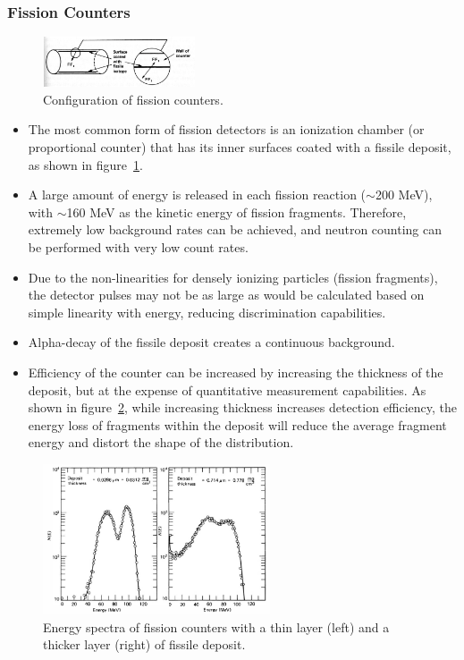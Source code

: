 \subsubsection{Fission Counters}
\begin{figure}[ht]
    \centering
    \includegraphics[width=0.4\textwidth]{images/fission_counter_config.png}
    \caption{Configuration of fission counters.}
    \label{fig:fission_counter_config}
\end{figure}
\begin{itemize}
    \item The most common form of fission detectors is an ionization chamber (or proportional counter) that has its inner surfaces coated with a fissile deposit, as shown in figure~\ref{fig:fission_counter_config}.
    \item A large amount of energy is released in each fission reaction ($\sim$200 MeV), with $\sim$160 MeV as the kinetic energy of fission fragments. Therefore, extremely low background rates can be achieved, and neutron counting can be performed with very low count rates. 
    \item Due to the non-linearities for densely ionizing particles (fission fragments), the detector pulses may not be as large as would be calculated based on simple linearity with energy, reducing discrimination capabilities.
    \item Alpha-decay of the fissile deposit creates a continuous background. 
    \item Efficiency of the counter can be increased by increasing the thickness of the deposit, but at the expense of quantitative measurement capabilities. As shown in figure~\ref{fig:fission_counter_efficiency}, while increasing thickness increases detection efficiency, the energy loss of fragments within the deposit will reduce the average fragment energy and distort the shape of the distribution. 
\end{itemize}
\begin{figure}[ht]
    \centering
    \includegraphics[width=0.6\textwidth]{images/fission_counter_efficiency.png}
    \caption{Energy spectra of fission counters with a thin layer (left) and a thicker layer (right) of fissile deposit.}
    \label{fig:fission_counter_efficiency}
\end{figure}
